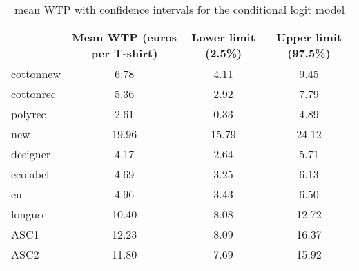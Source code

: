 \begin{table}[ht]
\centering
\begin{tabular}{lccc}
  \hline
 & Mean WTP (euros per T-shirt) & Lower limit (2.5\%) & Upper limit (97.5\%) \\ 
  \hline
cottonnew & 6.78 & 4.11 & 9.45 \\ 
  cottonrec & 5.36 & 2.92 & 7.79 \\ 
  polyrec & 2.61 & 0.33 & 4.89 \\ 
  new & 19.96 & 15.79 & 24.12 \\ 
  designer & 4.17 & 2.64 & 5.71 \\ 
  ecolabel & 4.69 & 3.25 & 6.13 \\ 
  eu & 4.96 & 3.43 & 6.50 \\ 
  longuse & 10.40 & 8.08 & 12.72 \\ 
  ASC1 & 12.23 & 8.09 & 16.37 \\ 
  ASC2 & 11.80 & 7.69 & 15.92 \\ 
   \hline
\end{tabular}
\caption{mean WTP with confidence intervals for the conditional logit model} 
\label{tab:ConditionalLogitModelWTP}
\end{table}
